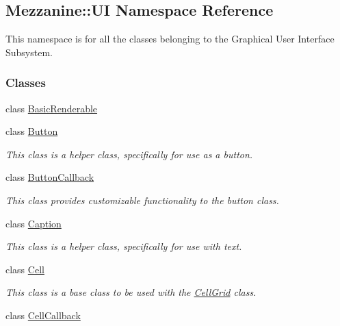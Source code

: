 \hypertarget{namespaceMezzanine_1_1UI}{
\subsection{Mezzanine::UI Namespace Reference}
\label{namespaceMezzanine_1_1UI}
}


This namespace is for all the classes belonging to the Graphical User Interface Subsystem.  


\subsubsection*{Classes}
\begin{DoxyCompactItemize}
\item 
class \hyperlink{classMezzanine_1_1UI_1_1BasicRenderable}{BasicRenderable}
\item 
class \hyperlink{classMezzanine_1_1UI_1_1Button}{Button}
\begin{DoxyCompactList}\small\item\em This class is a helper class, specifically for use as a button. \item\end{DoxyCompactList}\item 
class \hyperlink{classMezzanine_1_1UI_1_1ButtonCallback}{ButtonCallback}
\begin{DoxyCompactList}\small\item\em This class provides customizable functionality to the button class. \item\end{DoxyCompactList}\item 
class \hyperlink{classMezzanine_1_1UI_1_1Caption}{Caption}
\begin{DoxyCompactList}\small\item\em This class is a helper class, specifically for use with text. \item\end{DoxyCompactList}\item 
class \hyperlink{classMezzanine_1_1UI_1_1Cell}{Cell}
\begin{DoxyCompactList}\small\item\em This class is a base class to be used with the \hyperlink{classMezzanine_1_1UI_1_1CellGrid}{CellGrid} class. \item\end{DoxyCompactList}\item 
class \hyperlink{classMezzanine_1_1UI_1_1CellCallback}{CellCallback}

\end{DoxyCompactItemize}
